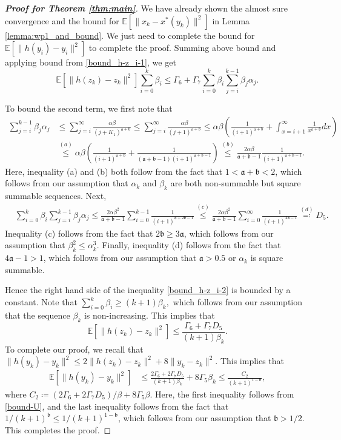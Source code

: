\documentclass[10pt,a4paper]{amsart}
\newcommand{\EE}{\mathbb{E}}
\newcommand{\afrak}{\mathfrak{a}}
\newcommand{\bfrak}{\mathfrak{b}}
\newcommand{\xstar}{x^*}
\begin{document}
\begin{proof}[\textbf{Proof for Theorem \ref{thm:main}}] We have already shown the almost sure convergence and the bound for $\EE[\|x_k-\xstar(y_k)\|^2]$ in Lemma \ref{lemma:wp1_and_bound}. We just need to complete the bound for $\EE[\|h(y_i)-y_i\|^2]$ to complete the proof.
Summing above bound and applying bound from \eqref{bound_h-z_i-1}, we get
\begin{equation}\label{bound_h-z_i-2}
    \EE\left[\|h(z_k)-z_k\|^2\right]\sum_{i=0}^k\beta_i\leq \Gamma_6+\Gamma_7\sum_{i=0}^k\beta_i\sum_{j=i}^{k-1}\beta_j\alpha_j.
\end{equation}

To bound the second term, we first note that 
\begin{align*}
    \sum_{j=i}^{k-1}\beta_j\alpha_j&\leq\sum_{j=i}^{\infty}\frac{\alpha\beta}{(j+K_1)^{\afrak+\bfrak}}\leq\sum_{j=i}^{\infty}\frac{\alpha\beta}{(j+1)^{\afrak+\bfrak}}\leq\alpha\beta\left(\frac{1}{(i+1)^{\afrak+\bfrak}}+\int_{x=i+1}^\infty \frac{1}{x^{\afrak+\bfrak}}dx\right)\\
    &\stackrel{(a)}{\leq} \alpha\beta\left(\frac{1}{(i+1)^{\afrak+\bfrak}}+\frac{1}{(\afrak+\bfrak-1)(i+1)^{\afrak+\bfrak-1}}\right)\stackrel{(b)}{\leq} \frac{2\alpha\beta}{\afrak+\bfrak-1}\frac{1}{(i+1)^{\afrak+\bfrak-1}}.
\end{align*}
Here, inequality (a) and (b) both follow from the fact that $1< \afrak+\bfrak<2$, which follows from our assumption that $\alpha_k$ and $\beta_k$ are both non-summable but square summable sequences. Next, 
\begin{align*}
    &\sum_{i=0}^k\beta_i\sum_{j=i}^{k-1}\beta_j\alpha_j\leq \frac{2\alpha\beta^2}{\afrak+\bfrak-1}\sum_{i=0}^{k-1}\frac{1}{(i+1)^{\afrak+2\bfrak-1}}\stackrel{(c)}{\leq} \frac{2\alpha\beta^2}{\afrak+\bfrak-1}\sum_{i=0}^\infty\frac{1}{(i+1)^{4\afrak-1}}\stackrel{(d)}{\eqqcolon} D_5.
\end{align*}
 Inequality (c) follows from the fact that $2\bfrak\geq 3\afrak$, which follows from our assumption that $\beta_k^2\leq \alpha_k^3$. Finally, inequality (d) follows from the fact that $4\afrak-1>1$, which follows from our assumption that $\afrak>0.5$ or $\alpha_k$ is square summable. 

Hence the right hand side of the inequality \eqref{bound_h-z_i-2} is bounded by a constant. Note that $\sum_{i=0}^k \beta_i\geq (k+1)\beta_k,$ which follows from our assumption that the sequence $\beta_k$ is non-increasing. This implies that 
$$\EE\left[\|h(z_k)-z_k\|^2\right]\leq \frac{\Gamma_6+\Gamma_7D_5}{(k+1)\beta_k}.$$ 
To complete our proof, we recall that $\|h(y_k)-y_k\|^2\leq 2\|h(z_k)-z_k\|^2+8\|y_k-z_k\|^2.$
This implies that 
\begin{align}\label{final-bound-y}
   \EE\left[\|h(y_k)-y_k\|^2\right] &\leq \frac{2\Gamma_6+2\Gamma_7D_5}{(k+1)\beta_k}+8\Gamma_5\beta_k\leq \frac{C_2}{(k+1)^{1-\bfrak}},
\end{align}
where $C_2\coloneqq (2\Gamma_6+2\Gamma_7D_5)/\beta+8\Gamma_5\beta$. Here, the first inequality follows from \eqref{bound-U}, and the last inequality follows from the fact that $1/(k+1)^{\bfrak}\leq 1/(k+1)^{1-\bfrak}$, which follows from our assumption that $\bfrak>1/2$. This completes the proof.
\end{proof}
\end{document}
